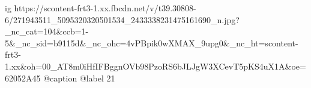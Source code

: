  
 
 
 
 

\ifcmt
  ig https://scontent-frt3-1.xx.fbcdn.net/v/t39.30808-6/271943511_5095320320501534_2433338231475161690_n.jpg?_nc_cat=104&ccb=1-5&_nc_sid=b9115d&_nc_ohc=4vPBpik0wXMAX_9upg0&_nc_ht=scontent-frt3-1.xx&oh=00_AT8m0iHfIFBggnOVb98PzoRS6bJLJgW3XCevT5pKS4uX1A&oe=62052A45
  @caption @label 21
\fi


